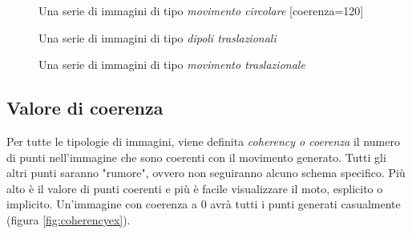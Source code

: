 \begin{figure}
	\centering
	\hfill
	\hfill
	\hfill
	\hfill
	\caption{Una serie di immagini di tipo \textit{movimento circolare} [coerenza=120]}
	\label{fig:seriemovcirc}
\end{figure}

\begin{figure}
	\centering
	\hfill
	\hfill
	\hfill
	\hfill
	\caption{Una serie di immagini di tipo \textit{dipoli traslazionali} \newline [coerenza=120, theta=45]}
	\label{fig:seriedipolit}
\end{figure}

\begin{figure}
	\centering
	\hfill
	\hfill
	\hfill
	\hfill
	\caption{Una serie di immagini di tipo \textit{movimento traslazionale} \newline [coerenza=120, theta=45]}
	\label{fig:seriemovtrasl}
\end{figure}

\newpage
\subsection{Valore di coerenza}

Per tutte le tipologie di immagini, viene definita \textit{coherency o coerenza} il numero di punti nell'immagine che sono coerenti con il movimento generato. Tutti gli altri punti saranno "rumore", ovvero non seguiranno alcuno schema specifico. Più alto è il valore di punti coerenti e più è facile visualizzare il moto, esplicito o implicito. Un'immagine con coerenza a 0 avrà tutti i punti generati casualmente (figura \ref{fig:coherencyex}).

